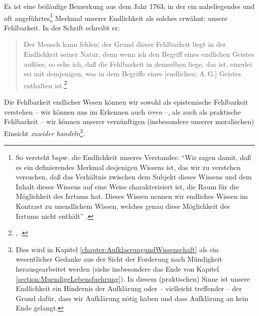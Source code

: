 Es ist eine beiläufige Bemerkung aus dem Jahr 1763, in der 
ein naheliegendes und oft angeführtes\footnote{So versteht bspw.
 die Endlichkeit unseres Verstandes:
\enquote{Wir sagen damit, daß es ein definierendes Merkmal desjenigen Wissens
ist, das wir zu verstehen versuchen, daß das Verhältnis zwischen dem Subjekt
dieses Wissens und dem Inhalt dieses Wissens auf eine Weise charakterisiert ist,
die Raum für die Möglichkeit des Irrtums hat. Dieses Wissen nennen wir endliches
Wissen im Kontrast zu unendlichem Wissen, welches genau diese Möglichkeit des
Irrtums nicht enthält} \parencite[][23]{Kern:QuellendesWissens2006}.} Merkmal
unserer Endlichkeit als solches erwähnt: unsere Fehlbarkeit. In der Schrift
 schreibt er:
\begin{quote}
 Der Mensch kann fehlen; der Grund dieser Fehlbarkeit liegt in der Endlichkeit
 seiner Natur, denn wenn ich den Begriff eines endlichen Geistes auflöse, so
 sehe ich, daß die Fehlbarkeit in demselben liege, das ist, einerlei sei mit
 demjenigen, was in dem Begriffe eines [endlichen; A.\,G.] Geistes enthalten
 ist.\footnote{\cite[][A 68]{Kant:VersuchdenBegriffdernegativenGroessenindieWeltweisheiteinzufuehren1977},
 \cite[][II: 202.23--27]{Kant:GesammelteWerke1900ff.}.}
\end{quote}
Die Fehlbarkeit endlicher Wesen können wir sowohl als epistemische Fehlbarkeit
verstehen -- wir können uns im Erkennen auch \emph{irren} --, als auch als
praktische Fehlbarkeit -- wir können unserer vernünftigen (insbesondere unserer
moralischen) Einsicht \emph{zuwider handeln}\footnote{Dies wird in Kapitel
\ref{chapter:AufklaerungundWissenschaft} als ein wesentlicher Gedanke aus der
Sicht der Forderung nach Mündigkeit herausgearbeitet werden (siehe
insbesondere das Ende von Kapitel \ref{section:MuendigeLebensfuehrung}). In
diesem (praktischen) Sinne ist unsere Endlichkeit ein Hindernis der Aufklärung oder -- vielleicht
treffender -- der Grund dafür, dass wir Aufklärung nötig haben und dass
Aufklärung an kein Ende gelangt.}.

